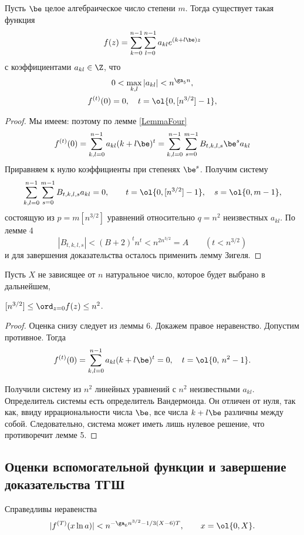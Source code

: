 \documentclass{article}
\begin{document}
\begin{lemma}
Пусть $\be$ \т целое алгебраическое число степени $m$.
Тогда существует такая функция
$$
f(z)=\sum_{k=0}^{n-1} \sum_{l=0}^{n-1} a_{kl} e^{(k+l\be)z}
$$
с коэффициентами $a_{kl} \in \Z$, что
\begin{gather}
0 < \max_{k,l} |a_{kl}| < n^{\ga_5n}, \\
f^{(t)}(0)=0, \quad t= \ol {0,[n^{3/2}]-1},
\end{gather}
\end{lemma}
\begin{proof}
Мы имеем:
поэтому по лемме \ref{LemmaFour}
$$
f^{(t)}(0)=\sum_{k,l=0}^{n-1}a_{kl}(k+l\be)^t=
\sum_{k,l=0}^{n-1}\sum_{s=0}^{m-1}B_{t,k,l,s}\be^sa_{kl}
$$
Приравняем к нулю коэффициенты при степенях $\be^s$. Получим систему
$$
\sum_{k,l=0}^{n-1}\sum_{s=0}^{m-1}B_{t,k,l,s}a_{kl}=0, \qquad
t=\ol{0,[n^{3/2}]-1}, \quad s=\ol{0,m-1},
$$
состоящую из $p=m[n^{3/2}]$   уравнений относительно $q=n^2$
неизвестных $a_{kl}$.  По лемме 4
$$
|B_{t,k,l,s}|<(B+2)^tn^t<n^{2n^{3/2}}=A \qquad (t<n^{3/2})
$$
и для завершения доказательства осталось применить лемму Зигеля.
\end{proof}

Пусть $X$ \т не зависящее от $n$ натуральное число,
которое будет выбрано в дальнейшем,
\begin{lemma}
$[n^{3/2}] \le \ord_{z=0}f(z) \le n^2$.
\end{lemma}
\begin{proof}
Оценка снизу следует из леммы 6. Докажем правое
неравенство. Допустим противное. Тогда
$$
f^{(t)}(0)=\sum_{k,l=0}^{n-1}a_{kl}(k+l\be)^t= 0, \quad t=\ol {0, \,n^2-1}.
$$

Получили систему из $n^2$ линейных уравнений с $n^2$  неизвестными $a_{kl}$.
Определитель системы есть определитель Вандермонда. Он отличен от нуля,
так как, ввиду иррациональности числа $\be$, все числа $k+l\be$
различны между собой. Следовательно, система может иметь лишь нулевое решение,
что противоречит лемме 5.
\end{proof}

\subsection{Оценки вспомогательной функции и завершение доказательства ТГШ}


\begin{lemma}
Справедливы неравенства
$$
|f^{(T)}(x \ln a)| < n^{-\ga_6n^{3/2}-1/3(X-6)T}, \qquad x=\ol{0,X}.
$$
\end{lemma}
\end{document}
